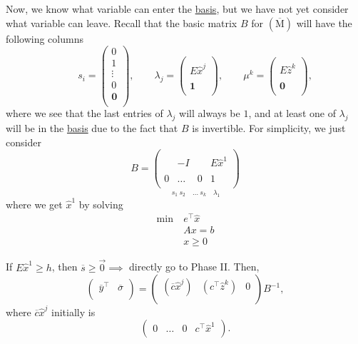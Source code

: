 Now, we know what variable can enter the \hyperref[def:basis]{basis}, but we have not yet consider what variable can leave. Recall that the basic matrix \(B\) for \((\overline{\mathrm{M}})\) will have the following columns
\[
	\qquad s_{i} = \begin{pmatrix}
		0      \\
		1      \\
		\vdots \\
		0      \\
		\bm{0} \\
	\end{pmatrix}, \qquad \lambda_{j} = \begin{pmatrix}
		\\
		E \hat{x}^j \\
		\\
		\bm{1}      \\
	\end{pmatrix}, \qquad \mu^k =\begin{pmatrix}
		\\
		E \hat{z}^k \\
		\\
		\bm{0}      \\
	\end{pmatrix},
\]
where we see that the last entries of \(\lambda_{j}\) will always be \(1\), and at least one of \(\lambda_{j}\) will be in the \hyperref[def:basis]{basis} due to the fact that \(B\) is invertible. For simplicity, we just consider
\[
	B = \underset{s_1\ s_2\quad \ldots\ s_k\quad \lambda_1}{
		\begin{pmatrix}
			  &        &   &             \\
			  & -I     &   & E \hat{x}^1 \\
			  &        &   &             \\
			0 & \ldots & 0 & 1           \\
		\end{pmatrix}}
\]
where we get \(\hat{x}^1\) by solving
\[
	\begin{aligned}
		\min~ & e^{\top}\hat{x} \\
		      & Ax = b          \\
		      & x\geq 0
	\end{aligned}
\]

If \(E \hat{x}^1\geq h\), then \(\overline{s}\geq \vec{0}\implies\) directly go to Phase II. Then,
\[
	\begin{pmatrix}
		\overline{y}^{\top} & \overline{\sigma} \\
	\end{pmatrix} = \begin{pmatrix}
		(\overline{c}\hat{x}^j) & (c^{\top}\hat{z}^k) & 0 \\
	\end{pmatrix}B^{-1},
\]
where \(\overline{c}\hat{x}^j\) initially is
\[
	\begin{pmatrix}
		0 & \ldots & 0 & c^{\top}\hat{x}^1 \\
	\end{pmatrix}.
\]

